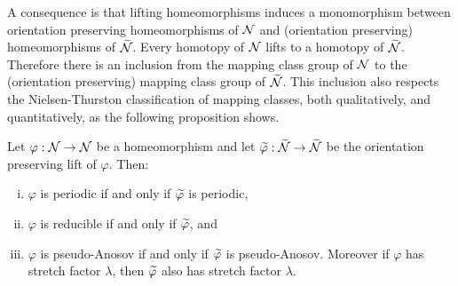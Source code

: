 A consequence is that lifting homeomorphisms induces a monomorphism between orientation preserving homeomorphisms of $\mathcal{N}$ and (orientation preserving) homeomorphisms of $\widetilde{\mathcal{N}}$.
Every homotopy of $\mathcal{N}$ lifts to a homotopy of $\widetilde{\mathcal{N}}$.
Therefore there is an inclusion from the mapping class group of $\mathcal{N}$ to the (orientation preserving) mapping class group of $\widetilde{\mathcal{N}}$.
This inclusion also respects the Nielsen-Thurston classification of mapping classes, both qualitatively, and quantitatively, as the following proposition shows.
\begin{prop}
  \label{prop:2}
  Let $\varphi:\mathcal{N}\rightarrow\mathcal{N}$ be a homeomorphism and let $\widetilde{\varphi}:\widetilde{\mathcal{N}}\rightarrow\widetilde{\mathcal{N}}$ be the orientation preserving lift of $\varphi$.  Then:
  \begin{enumerate}[(i)]
  \item $\varphi$ is periodic if and only if $\widetilde{\varphi}$ is periodic,
  \item $\varphi$ is reducible if and only if $\widetilde{\varphi}$, and
  \item $\varphi$ is pseudo-Anosov if and only if $\widetilde{\varphi}$ is pseudo-Anosov.  Moreover if $\varphi$ has stretch factor $\lambda$, then $\widetilde{\varphi}$ also has stretch factor $\lambda$.
  \end{enumerate}
\end{prop}
